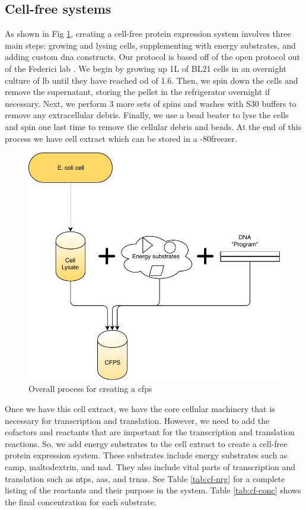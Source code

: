 \subsection{Cell-free systems}
As shown in Fig \ref{fig:cfps}, creating a cell-free protein expression system involves three main steps: growing and lysing cells, supplementing with energy substrates, and adding custom \gls{dna} constructs.
Our protocol is based off of the open protocol out of the Federici lab \cite{medina2017cfps}.
We begin by growing up 1L of BL21 \ecoli cells in an overnight culture of \gls{lb} until they have reached \gls{od} of 1.6.
Then, we spin down the cells and remove the supernatant, storing the pellet in the refrigerator overnight if necessary.
Next, we perform 3 more sets of spins and washes with S30 buffers to remove any extracellular debris.
Finally, we use a bead beater to lyse the cells and spin one last time to remove the cellular debris and beads.
At the end of this process we have cell extract which can be stored in a -80\degree freezer.
\begin{figure}[t!]
\begin{center}
\includegraphics{figs/CellFreeSetup.pdf}
\caption{Overall process for creating a \gls{cfps}}
\end{center}
\label{fig:cfps}
\end{figure}

Once we have this cell extract, we have the core cellular machinery that is necessary for transcription and translation.
However, we need to add the cofactors and reactants that are important for the transcription and translation reactions.
So, we add energy substrates to the cell extract to create a cell-free protein expression system.
These substrates include energy substrates such as \gls{camp}, maltodextrin, and \gls{nad}.
They also include vital parts of transcription and translation such as \glspl{ntp}, \glspl{aa}, and \glspl{trna}.
See Table \ref{tab:cf-nrg} for a complete listing of the reactants and their purpose in the system.
Table \ref{tab:cf-conc} shows the final concentration for each substrate.


